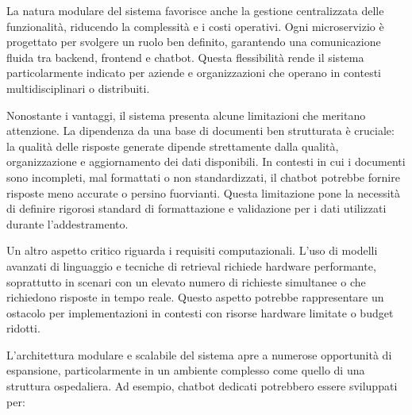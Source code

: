 \documentclass[a4paper,twoside,12pt]{toptesi}
\begin{document}
La natura modulare del sistema favorisce anche la gestione centralizzata delle funzionalità, riducendo la complessità e i costi operativi. Ogni microservizio è progettato per svolgere un ruolo ben definito, garantendo una comunicazione fluida tra backend, frontend e chatbot. Questa flessibilità rende il sistema particolarmente indicato per aziende e organizzazioni che operano in contesti multidisciplinari o distribuiti.

Nonostante i vantaggi, il sistema presenta alcune limitazioni che meritano attenzione. La dipendenza da una base di documenti ben strutturata è cruciale: la qualità delle risposte generate dipende strettamente dalla qualità, organizzazione e aggiornamento dei dati disponibili. In contesti in cui i documenti sono incompleti, mal formattati o non standardizzati, il chatbot potrebbe fornire risposte meno accurate o persino fuorvianti. Questa limitazione pone la necessità di definire rigorosi standard di formattazione e validazione per i dati utilizzati durante l'addestramento.

Un altro aspetto critico riguarda i requisiti computazionali. L'uso di modelli avanzati di linguaggio e tecniche di retrieval richiede hardware performante, soprattutto in scenari con un elevato numero di richieste simultanee o che richiedono risposte in tempo reale. Questo aspetto potrebbe rappresentare un ostacolo per implementazioni in contesti con risorse hardware limitate o budget ridotti.

L'architettura modulare e scalabile del sistema apre a numerose opportunità di espansione, particolarmente in un ambiente complesso come quello di una struttura ospedaliera. Ad esempio, chatbot dedicati potrebbero essere sviluppati per:
\end{document}
